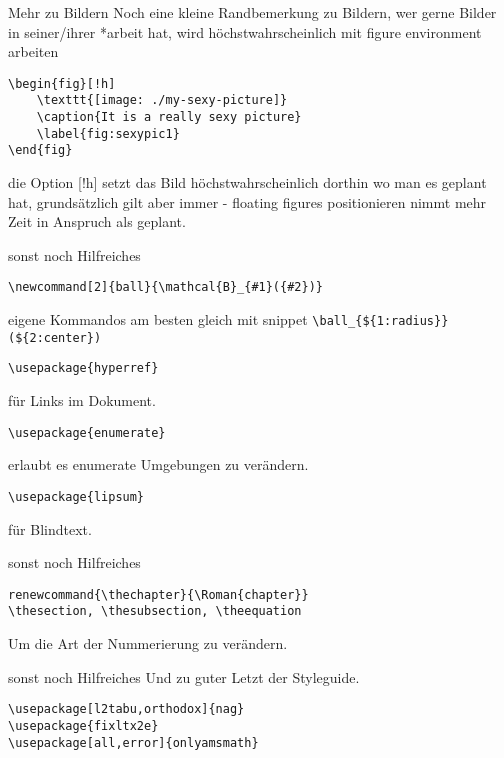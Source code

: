 \documentclass{beamer}
\begin{document}
\begin{frame}[fragile]{Mehr zu Bildern}
Noch eine kleine Randbemerkung zu Bildern, wer gerne Bilder in seiner/ihrer
*arbeit hat, wird höchstwahrscheinlich mit figure environment arbeiten
\footnotesize
\begin{verbatim}
\begin{fig}[!h]
    \texttt{[image: ./my-sexy-picture]}
    \caption{It is a really sexy picture}
    \label{fig:sexypic1}
\end{fig}
\end{verbatim}
die Option [!h] setzt das Bild höchstwahrscheinlich dorthin wo man es geplant
hat, grundsätzlich gilt aber immer - floating figures positionieren nimmt mehr
Zeit in Anspruch als geplant.
\end{frame}

\begin{frame}[fragile]{sonst noch Hilfreiches}
    \footnotesize
    \begin{verbatim}
\newcommand[2]{ball}{\mathcal{B}_{#1}({#2})}
    \end{verbatim}
    \vspace*{-0.7cm}
    eigene Kommandos am besten gleich mit snippet
    \verb/\ball_{${1:radius}}(${2:center})/
    \begin{verbatim}
\usepackage{hyperref}
    \end{verbatim}
    \vspace*{-0.7cm}
    für Links im Dokument.
    \begin{verbatim}
\usepackage{enumerate}
    \end{verbatim}
    \vspace*{-0.7cm}
    erlaubt es enumerate Umgebungen zu verändern.
    \begin{verbatim}
\usepackage{lipsum}
    \end{verbatim}
    \vspace*{-0.7cm}
    für Blindtext.
    \normalsize
\end{frame}


\begin{frame}[fragile]{sonst noch Hilfreiches}
    \begin{verbatim}
renewcommand{\thechapter}{\Roman{chapter}}
\thesection, \thesubsection, \theequation
    \end{verbatim}
    Um die Art der Nummerierung zu verändern.
\end{frame}

\begin{frame}[fragile]{sonst noch Hilfreiches}
    Und zu guter Letzt der Styleguide.
    \begin{verbatim}
\usepackage[l2tabu,orthodox]{nag}
\usepackage{fixltx2e}
\usepackage[all,error]{onlyamsmath}
    \end{verbatim}
\end{frame}
\end{document}
